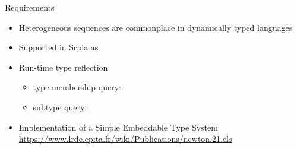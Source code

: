 \begin{frame}{Requirements}
  \begin{itemize}
  \item Heterogeneous sequences are commonplace in dynamically typed languages
  \item Supported in Scala as 
  \item Run-time type reflection 
    \begin{itemize}
    \item type membership query:
    \item subtype query: 
    \end{itemize}
  \item Implementation of a Simple Embeddable Type System
    \url{https://www.lrde.epita.fr/wiki/Publications/newton.21.els}
  \end{itemize}
\end{frame}
